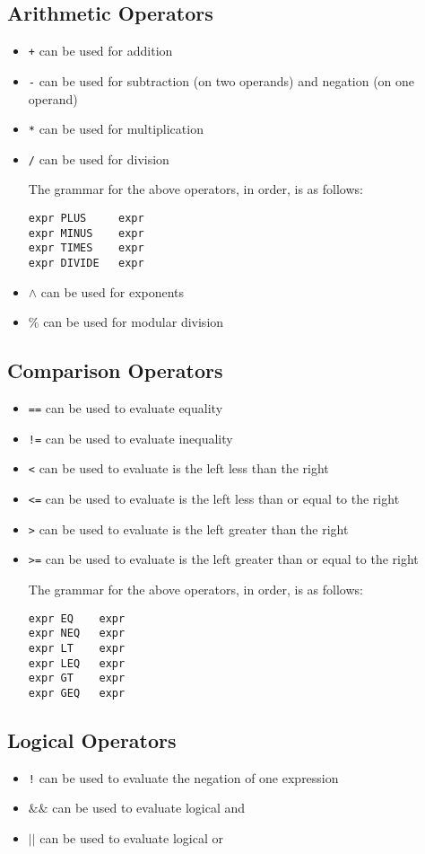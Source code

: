 \documentclass{article}
\begin{document}
\subsection{Arithmetic Operators}
\begin{itemize}
\item \texttt{+} can be used for addition
\item \texttt{-} can be used for subtraction (on two operands) and negation (on one operand)
\item \texttt{*} can be used for multiplication
\item \texttt{/} can be used for division


The grammar for the above operators, in order, is as follows:
\begin{Verbatim}[frame=single]
expr PLUS     expr
expr MINUS    expr
expr TIMES    expr
expr DIVIDE   expr
\end{Verbatim}
\item \texttt{$\wedge$} can be used for exponents
\item \texttt{$\%$} can be used for modular division
\end{itemize}

\subsection{Comparison Operators}
\begin{itemize}
\item \texttt{==} can be used to evaluate equality
\item \texttt{!=} can be used to evaluate inequality
\item \texttt{<} can be used to evaluate is the left less than the right
\item \texttt{<=} can be used to evaluate is the left less than or equal to the right
\item \texttt{>} can be used to evaluate is the left greater than the right
\item \texttt{>=} can be used to evaluate is the left greater than or equal to the right

The grammar for the above operators, in order, is as follows:
\begin{Verbatim}[frame=single]
expr EQ    expr
expr NEQ   expr
expr LT    expr
expr LEQ   expr
expr GT    expr
expr GEQ   expr
\end{Verbatim}
\end{itemize}

\subsection{Logical Operators}
\begin{itemize}
\item \texttt{!} can be used to evaluate the negation of one expression
\item \texttt{$\&\&$} can be used to evaluate logical and
\item \texttt{$\vert\vert$} can be used to evaluate logical or
\end{itemize}
\end{document}
